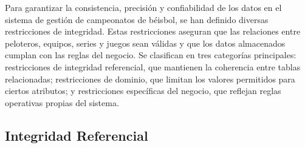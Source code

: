 \documentclass{report}
\begin{document}
    Para garantizar la consistencia, precisión y confiabilidad de los datos en el sistema de gestión de campeonatos 
    de béisbol, se han definido diversas restricciones de integridad. Estas restricciones aseguran que las 
    relaciones entre peloteros, equipos, series y juegos sean válidas y que los datos almacenados cumplan con las 
    reglas del negocio. Se clasifican en tres categorías principales: restricciones de integridad referencial, que 
    mantienen la coherencia entre tablas relacionadas; restricciones de dominio, que limitan los valores permitidos 
    para ciertos atributos; y restricciones específicas del negocio, que reflejan reglas operativas propias del 
    sistema.

    \subsection*{Integridad Referencial}
\end{document}
